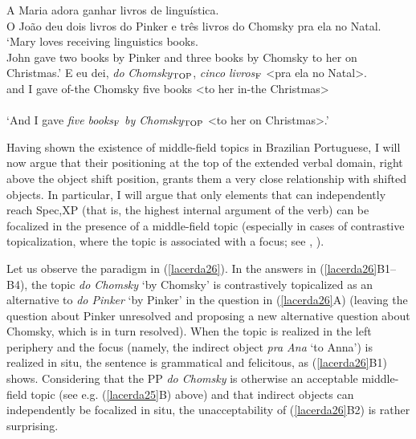 \documentclass[output=paper]{langscibook}
\begin{document}
\begin{exe}
\ex \label{lacerda25}
\begin{xlist}
 \label{lacerda25A}
A Maria adora ganhar livros de linguística.\\
O João deu dois livros do Pinker e três livros do Chomsky pra ela no Natal.\\
`Mary loves receiving linguistics books.\\
John gave two books by Pinker and three books by Chomsky to her on Christmas.'
 \label{lacerda25B}
\gll E 	eu 	dei, 	\emph{do} 	\emph{Chomsky}$_{\textnormal{TOP}}$, 	\emph{cinco} 	\emph{livros}$_{\textnormal{F}}$ 	<pra 	ela 	no 	Natal>.\\
and	I 	gave 	of-the 	Chomsky 	five 	books 	<to 	her 	in-the 	Christmas>\\\\
`And I gave \emph{five books}$_{\textnormal{F}}$ \emph{by Chomsky}$_{\textnormal{TOP}}$ <to her on Christmas>.'

\end{xlist}
\end{exe}

Having shown the existence of middle-field topics in Brazilian Portuguese, I will now argue that their positioning at the top of the extended verbal domain, right above the object shift position, grants them a very close relationship with shifted objects. In particular, I will argue that only elements that can independently reach Spec,XP (that is, the highest internal argument of the verb) can be focalized in the presence of a middle-field topic (especially in cases of contrastive topicalization, where the topic is associated with a focus; see \citealt{Buring2003}, \citealt{Wagner2012}).

Let us observe the paradigm in (\ref{lacerda26}). In the answers in (\ref{lacerda26}B1–B4), the topic \emph{do Chomsky} ‘by Chomsky’ is contrastively topicalized as an alternative to \emph{do Pinker} ‘by Pinker’ in the question in (\ref{lacerda26}A) (leaving the question about Pinker unresolved and proposing a new alternative question about Chomsky, which is in turn resolved). When the topic is realized in the left periphery and the focus (namely, the indirect object \emph{pra Ana} ‘to Anna’) is realized in situ, the sentence is grammatical and felicitous, as (\ref{lacerda26}B1) shows. Considering that the PP \emph{do Chomsky} is otherwise an acceptable middle-field topic (see e.g. (\ref{lacerda25}B) above) and that indirect objects can independently be focalized in situ, the unacceptability of (\ref{lacerda26}B2) is rather surprising.
\end{document}
